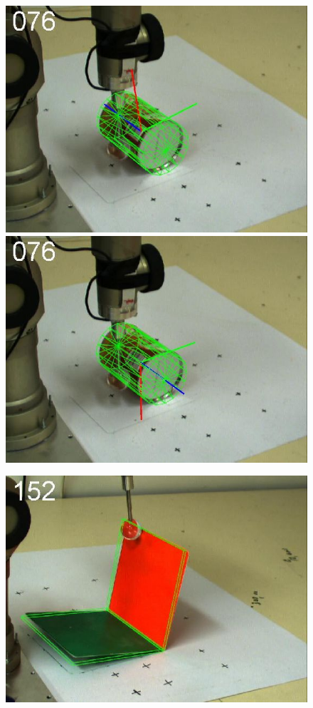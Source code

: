 \begin{figure}[htbp]
{\includegraphics[width=\imgAXwid]{./A3_LWPR1_39_1}
\includegraphics[width=\imgAXwid]{./A3_physx_39_1}
}
\centerline{
\includegraphics[width=\imgAXwid]{./A1_2exp_667_2}
}
\end{figure}
